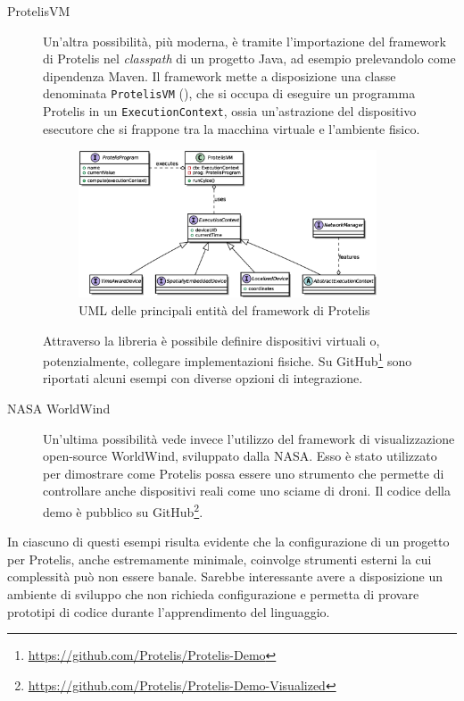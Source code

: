 \begin{description}
    \item[ProtelisVM]\cite{amslaurea19778}
      Un'altra possibilità, più moderna, è tramite l'importazione del framework di Protelis nel \emph{classpath} di un progetto Java, ad esempio prelevandolo come dipendenza Maven.
      Il framework mette a disposizione una classe denominata \texttt{ProtelisVM} (), che si occupa di eseguire un programma Protelis in un \texttt{ExecutionContext},
      ossia un'astrazione del dispositivo esecutore che si frappone tra la macchina virtuale e l'ambiente fisico.

      \begin{figure}[htbp]
        \centering
        \includegraphics[width=0.87\textwidth]{res/uml/ExecutionContext.eps}%
        \caption{UML delle principali entità del framework di Protelis}%
        \label{fig:protelisvm}
      \end{figure}

      Attraverso la libreria è possibile definire dispositivi virtuali o, potenzialmente, collegare implementazioni fisiche.
      Su GitHub\footnote{\url{https://github.com/Protelis/Protelis-Demo}} sono riportati alcuni esempi con diverse opzioni di integrazione.

    \item[NASA WorldWind]\cite{4161692}
      Un'ultima possibilità vede invece l'utilizzo del framework di visualizzazione open-source WorldWind, sviluppato dalla NASA\@.
      Esso è stato utilizzato per dimostrare come Protelis possa essere uno strumento che permette di controllare anche dispositivi reali come uno sciame di droni.
      Il codice della demo è pubblico su GitHub\footnote{\url{https://github.com/Protelis/Protelis-Demo-Visualized}}.
  \end{description}

  In ciascuno di questi esempi risulta evidente che la configurazione di un progetto per Protelis, anche estremamente minimale, coinvolge strumenti esterni la cui complessità può non essere banale.
  Sarebbe interessante avere a disposizione un ambiente di sviluppo che non richieda configurazione e permetta di provare prototipi di codice durante l'apprendimento del linguaggio.

